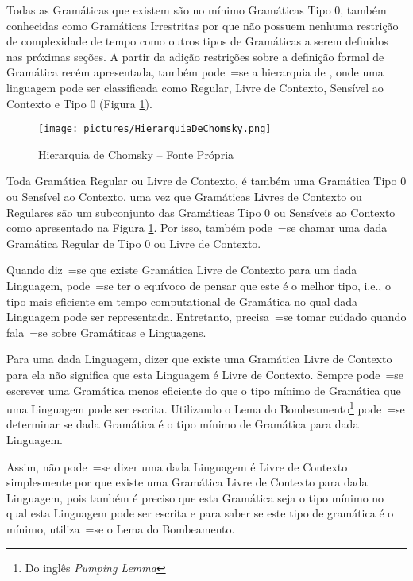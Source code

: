 {    Todas as Gramáticas que existem são no mínimo Gramáticas Tipo 0,
    também conhecidas como Gramáticas Irrestritas por que não possuem nenhuma restrição de complexidade de tempo como outros tipos de Gramáticas a serem definidos nas próximas seções{}.
    A partir da adição restrições sobre a definição formal de Gramática recém apresentada,
    também pode~=se  a hierarquia de ,
    onde uma linguagem pode ser classificada como Regular,
    Livre de Contexto,
    Sensível ao Contexto e
    Tipo 0 (Figura \ref{fig:pictures/HierarquiaDeChomsky.png}).
    \begin{figure}[H]
    \centering
    \texttt{[image: pictures/HierarquiaDeChomsky.png]}
    \caption{Hierarquia de Chomsky -- Fonte Própria }
    \label{fig:pictures/HierarquiaDeChomsky.png}
    \end{figure}

    Toda Gramática Regular ou
    Livre de Contexto,
    é também uma Gramática Tipo 0 ou
    Sensível ao Contexto,
    uma vez que Gramáticas Livres de Contexto ou
    Regulares são um subconjunto das Gramáticas Tipo 0 ou
    Sensíveis ao Contexto como apresentado na Figura \ref{fig:pictures/HierarquiaDeChomsky.png}.
    Por isso,
    também pode~=se chamar uma dada Gramática Regular de Tipo 0 ou
    Livre de Contexto.

    Quando diz~=se que existe Gramática Livre de Contexto para um dada Linguagem,
    pode~=se ter o equívoco de pensar que este é o melhor tipo,
    i.e.,
    o tipo mais eficiente em tempo computational de Gramática no qual dada Linguagem pode ser representada.
    Entretanto,
    precisa~=se tomar cuidado quando fala~=se sobre Gramáticas e
    Linguagens.

    Para uma dada Linguagem,
    dizer que existe uma Gramática Livre de Contexto para ela não significa que esta Linguagem é Livre de Contexto.
    Sempre pode~=se escrever uma Gramática menos eficiente do que o tipo mínimo de Gramática que uma Linguagem pode ser escrita.
    Utilizando o Lema do Bombeamento\footnote{Do inglês \textit{Pumping Lemma}} \cite{hopcroftBook,sipserBook} pode~=se determinar se dada Gramática é o tipo mínimo de Gramática para dada Linguagem.

    Assim,
    não pode~=se dizer uma dada Linguagem é Livre de Contexto simplesmente por que existe uma Gramática Livre de Contexto para dada Linguagem,
    pois também é preciso que esta Gramática seja o tipo mínimo no qual esta Linguagem pode ser escrita e
    para saber se este tipo de gramática é o mínimo,
    utiliza~=se o Lema do Bombeamento.


}
